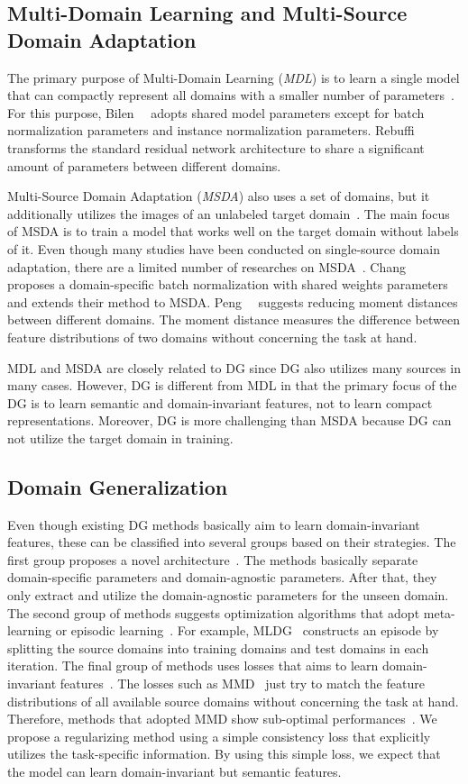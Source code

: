 \subsection{Multi-Domain Learning and Multi-Source Domain Adaptation}
The primary purpose of Multi-Domain Learning (\textit{MDL}) is to learn a single model that can compactly represent all domains with a smaller number of parameters~\cite{}. For this purpose, Bilen~\etal~\cite{} adopts shared model parameters except for batch normalization parameters and instance normalization parameters. Rebuffi~\etal~\cite{} transforms the standard residual network architecture to share a significant amount of parameters between different domains.

Multi-Source Domain Adaptation (\textit{MSDA}) also uses a set of domains, but it additionally utilizes the images of an unlabeled target domain~\cite{}. The main focus of MSDA is to train a model that works well on the target domain without labels of it. Even though many studies have been conducted on single-source domain adaptation, there are a limited number of researches on MSDA~\cite{}. Chang~\etal~\cite{} proposes a domain-specific batch normalization with shared weights parameters and extends their method to MSDA. Peng~\etal~\cite{} suggests reducing moment distances between different domains. The moment distance measures the difference between feature distributions of two domains without concerning the task at hand.

MDL and MSDA are closely related to DG since DG also utilizes many sources in many cases. However, DG is different from MDL in that the primary focus of the DG is to learn semantic and domain-invariant features, not to learn compact representations. Moreover, DG is more challenging than MSDA because DG can not utilize the target domain in training.


\subsection{Domain Generalization}
Even though existing DG methods basically aim to learn domain-invariant features, these can be classified into several groups based on their strategies. The first group proposes a novel architecture~\cite{}. The methods basically separate domain-specific parameters and domain-agnostic parameters. After that, they only extract and utilize the domain-agnostic parameters for the unseen domain. The second group of methods suggests optimization algorithms that adopt meta-learning or episodic learning~\cite{}. For example, MLDG~\cite{} constructs an episode by splitting the source domains into training domains and test domains in each iteration. The final group of methods uses losses that aims to learn domain-invariant features~\cite{}. The losses such as MMD~\cite{} just try to match the feature distributions of all available source domains without concerning the task at hand. Therefore, methods that adopted MMD show sub-optimal performances~\cite{}. We propose a regularizing method using a simple consistency loss that explicitly utilizes the task-specific information. By using this simple loss, we expect that the model can learn domain-invariant but semantic features.